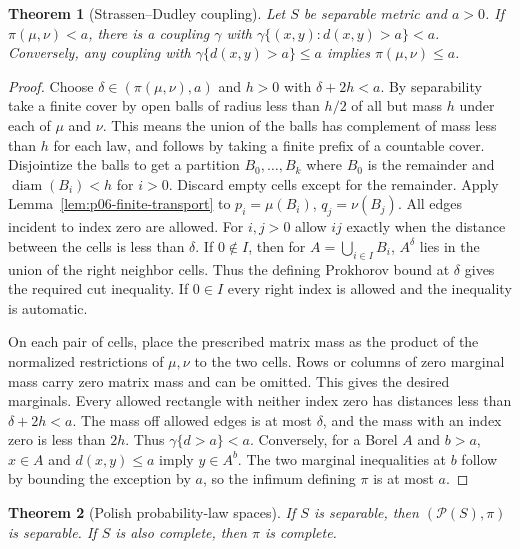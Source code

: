 \documentclass[11pt,oneside,openany]{book}
\theoremstyle{plain}
\newtheorem{theorem}{Theorem}[chapter]
\theoremstyle{definition}
\theoremstyle{remark}
\begin{document}
\begin{theorem}[Strassen--Dudley coupling]
\label{thm:p06-strassen}
Let \(S\) be separable metric and \(a>0\). If
\(\pi(\mu,\nu)<a\), there is a coupling \(\gamma\) with
\(\gamma\{(x,y):d(x,y)>a\}<a\). Conversely, any coupling with
\(\gamma\{d(x,y)>a\}\leq a\) implies \(\pi(\mu,\nu)\leq a\).
\end{theorem}

\begin{proof}
Choose \(\delta\in(\pi(\mu,\nu),a)\) and \(h>0\) with
\(\delta+2h<a\). By separability take a finite cover by
open balls of radius less than \(h/2\) of all but mass \(h\)
under each of \(\mu\) and \(\nu\). This means the union of the
balls has complement of mass less than \(h\) for each law,
and follows by taking a finite prefix of a countable cover.
Disjointize the balls to get a partition \(B_0,\dots,B_k\)
where \(B_0\) is the remainder and \(\operatorname{diam}(B_i)<h\)
for \(i>0\). Discard empty cells except for the remainder.
Apply Lemma~\ref{lem:p06-finite-transport} to
\(p_i=\mu(B_i)\), \(q_j=\nu(B_j)\).
All edges incident to index zero are allowed. For \(i,j>0\)
allow \(ij\) exactly when the distance between the cells is
less than \(\delta\). If \(0\notin I\), then for
\(A=\bigcup_{i\in I}B_i\), \(A^\delta\) lies in the union of
the right neighbor cells. Thus the defining Prokhorov bound
at \(\delta\) gives the required cut inequality. If \(0\in I\)
every right index is allowed and the inequality is automatic.

On each pair of cells, place the prescribed matrix mass as the
product of the normalized restrictions of \(\mu,\nu\) to the two
cells. Rows or columns of zero marginal mass carry zero
matrix mass and can be omitted. This gives the desired marginals.
Every allowed rectangle with neither index zero has distances
less than \(\delta+2h<a\). The mass off allowed edges is at most
\(\delta\), and the mass with an index zero is less than \(2h\).
Thus \(\gamma\{d>a\}<a\). Conversely, for a Borel \(A\) and
\(b>a\), \(x\in A\) and \(d(x,y)\leq a\) imply \(y\in A^b\).
The two marginal inequalities at \(b\) follow by bounding the
exception by \(a\), so the infimum defining \(\pi\) is at most \(a\).
\end{proof}

\begin{theorem}[Polish probability-law spaces]
\label{thm:p06-polish-laws}
If \(S\) is separable, then \((\mathcal P(S),\pi)\) is separable.
If \(S\) is also complete, then \(\pi\) is complete.
\end{theorem}
\end{document}
